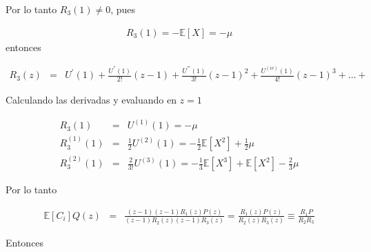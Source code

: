 \documentclass{article}
\newcommand{\esp}{\mathbb{E}}
\begin{document}
Por lo tanto $R_{3}\left(1\right)\neq0$, pues

\begin{eqnarray}\label{Eq.R2}
R_{3}\left(1\right)=-\esp\left[X\right]=-\mu
\end{eqnarray}
entonces

\begin{eqnarray}
R_{3}\left(z\right)&=&U^{'}\left(1\right)+\frac{U^{''}\left(1\right)}{2!}\left(z-1\right)+\frac{U^{'''}\left(1\right)}{3!}\left(z-1\right)^{2}+\frac{U^{(iv)}\left(1\right)}{4!}\left(z-1\right)^{3}+\ldots+
\end{eqnarray}

Calculando las derivadas y evaluando en $z=1$

\begin{eqnarray}
R_{3}\left(1\right)&=&U^{(1)}\left(1\right)=-\mu\\
R_{3}^{(1)}\left(1\right)&=&\frac{1}{2}U^{(2)}\left(1\right)=-\frac{1}{2}\esp\left[X^{2}\right]+\frac{1}{2}\mu\\
R_{3}^{(2)}\left(1\right)&=&\frac{2}{3!}U^{(3)}\left(1\right)
=-\frac{1}{3}\esp\left[X^{3}\right]+\esp\left[X^{2}\right]-\frac{2}{3}\mu
\end{eqnarray}

Por lo tanto

\begin{eqnarray}
\esp\left[C_{i}\right]Q\left(z\right)&=&\frac{\left(z-1\right)\left(z-1\right)R_{1}\left(z\right)P\left(z\right)}{\left(z-1\right)R_{2}\left(z\right)\left(z-1\right)R_{3}\left(z\right)}
=\frac{R_{1}\left(z\right)P\left(z\right)}{R_{2}\left(z\right)R_{3}\left(z\right)}\equiv\frac{R_{1}P}{R_{2}R_{3}}
\end{eqnarray}

Entonces
\end{document}

